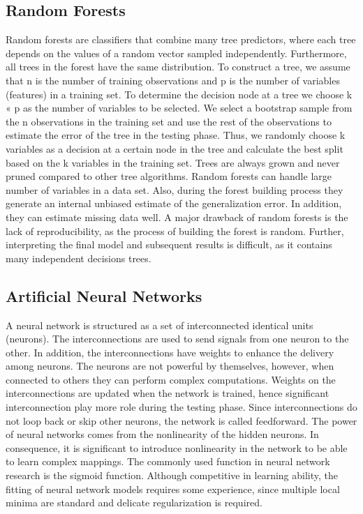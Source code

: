 \documentclass[conference]{IEEEtran}
\begin{document}
\subsection{Random Forests}
\par Random forests are classifiers that combine many tree
predictors, where each tree depends on the values of a random
vector sampled independently. Furthermore, all trees in the
forest have the same distribution. To construct a tree, we
assume that n is the number of training observations and p
is the number of variables (features) in a training set. To
determine the decision node at a tree we choose k « p as
the number of variables to be selected. We select a bootstrap
sample from the n observations in the training set and use
the rest of the observations to estimate the error of the tree
in the testing phase. Thus, we randomly choose k variables
as a decision at a certain node in the tree and calculate
the best split based on the k variables in the training set.
Trees are always grown and never pruned compared to other
tree algorithms. Random forests can handle large number
of variables in a data set. Also, during the forest building
process they generate an internal unbiased estimate of the
generalization error. In addition, they can estimate missing
data well. A major drawback of random forests is the lack of
reproducibility, as the process of building the forest is random.
Further, interpreting the final model and subsequent results is
difficult, as it contains many independent decisions trees.
\subsection{Artificial Neural Networks}
\par A neural network is structured as a set of interconnected
identical units (neurons). The interconnections are used to
send signals from one neuron to the other. In addition, the
interconnections have weights to enhance the delivery among
neurons. The neurons are not powerful by themselves, however,
when connected to others they can perform complex
computations. Weights on the interconnections are updated
when the network is trained, hence significant interconnection
play more role during the testing phase. Since interconnections do not loop back or skip other neurons, the network is called
feedforward. The power of neural networks comes from the
nonlinearity of the hidden neurons. In consequence, it is
significant to introduce nonlinearity in the network to be able
to learn complex mappings. The commonly used function in
neural network research is the sigmoid function. Although
competitive in learning ability, the fitting of neural network
models requires some experience, since multiple local minima
are standard and delicate regularization is required.
\end{document}
